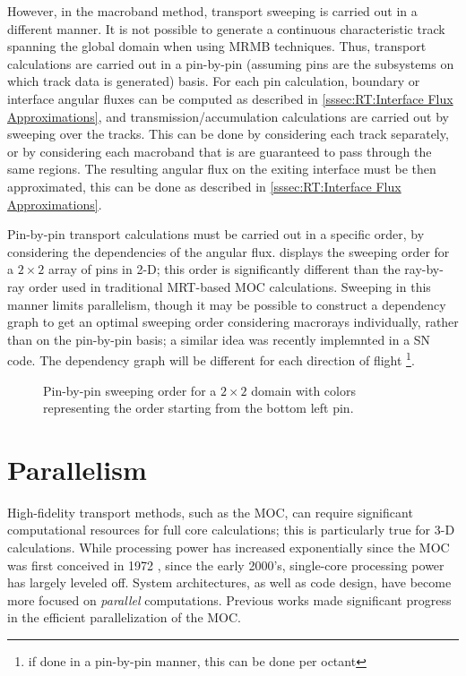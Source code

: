 {{{        However, in the macroband method, transport sweeping is carried out in a different manner.
        It is not possible to generate a continuous characteristic track spanning the global domain when using \ac{MRMB} techniques.
        Thus, transport calculations are carried out in a pin-by-pin (assuming pins are the subsystems on which track data is generated) basis.
        For each pin calculation, boundary or interface angular fluxes can be computed as described in \cref{sssec:RT:Interface Flux Approximations}, and transmission/accumulation calculations are carried out by sweeping over the tracks.
        This can be done by considering each track separately, or by considering each macroband that is are guaranteed to pass through the same regions.
        The resulting angular flux on the exiting interface must be then approximated, this can be done as described in \cref{sssec:RT:Interface Flux Approximations}.

        Pin-by-pin transport calculations must be carried out in a specific order, by considering the dependencies of the angular flux.
         displays the sweeping order for a $2\times2$ array of pins in 2-D; this order is significantly different than the ray-by-ray order used in traditional \ac{MRT}-based \ac{MOC} calculations.
        Sweeping in this manner limits parallelism, though it may be possible to construct a dependency graph to get an optimal sweeping order considering macrorays individually, rather than on the pin-by-pin basis; a similar idea was recently implemnted in a \ac{SN} code\cite{Adams2013}.
        The dependency graph will be different for each direction of flight \footnote{if done in a pin-by-pin manner, this can be done per octant}.

        \begin{figure}[h]
          \centering
          \def\svgwidth{0.45\linewidth}
          
          \caption{Pin-by-pin sweeping order for a $2\times2$ domain with colors representing the order starting from the bottom left pin.}
          \label{fig:RT:Macroband Sweep Order}
        \end{figure}
      }
    }

    \section{Parallelism}{\label{sec:MOC:Parallelism}
        High-fidelity transport methods, such as the \ac{MOC}, can require significant computational resources for full core calculations; this is particularly true for 3-D calculations.
        While processing power has increased exponentially since the \ac{MOC} was first conceived in 1972 \cite{Askew1972}, since the early 2000's, single-core processing power has largely leveled off.
        System architectures, as well as code design, have become more focused on \emph{parallel} computations.
        Previous works \cite{Kochunas2013} made significant progress in the efficient parallelization of the \ac{MOC}.

}}
